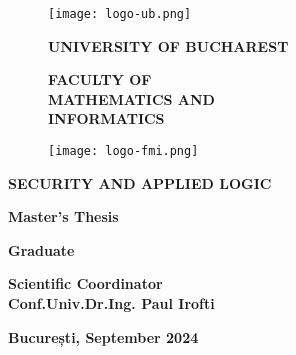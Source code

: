 \begin{titlepage}

\vspace{-5cm}

\begin{figure}[!htb]
    \centering
    \begin{minipage}{0.2\textwidth}
        \texttt{[image: logo-ub.png]}
    \end{minipage}
    \begin{minipage}{0.5\textwidth}
        \large
        \vspace{0.2cm}
        \begin{center}
            \textbf{UNIVERSITY OF BUCHAREST}
        \end{center}
        \vspace{0.3cm}
        \begin{center}
            \textbf{
                FACULTY OF \\
                MATHEMATICS AND \\
                INFORMATICS}
        \end{center}
    \end{minipage}
    \begin{minipage}{0.2\textwidth}
        \texttt{[image: logo-fmi.png]}
    \end{minipage}
\end{figure}

\begin{center}
\textbf{SECURITY AND APPLIED LOGIC}
\end{center}

\vspace{1cm}

\begin{center}
\Large \textbf{Master’s Thesis}
\end{center}

\begin{center}
\huge \textbf{\MakeUppercase{\@title}}
\end{center}

\vspace{3cm}

\begin{center}
\large \textbf{Graduate \\ \@author}
\end{center}

\vspace{0.25cm}

\begin{center}
\large \textbf{Scientific Coordinator\\ Conf.Univ.Dr.Ing. Paul Irofti}
\end{center}

\vspace{2cm}

\begin{center}
    \Large\textbf{București, September 2024}
\end{center}
\end{titlepage}
